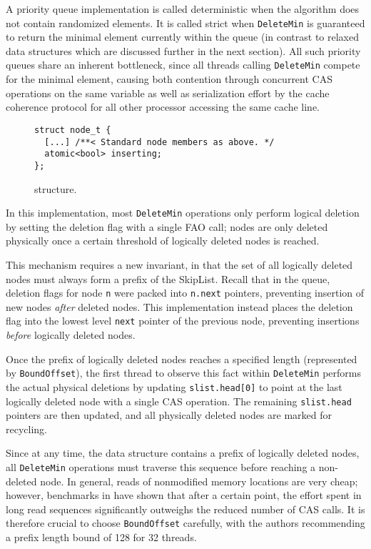 A priority queue implementation is called deterministic when the algorithm does not contain randomized elements.
It is called strict when \lstinline|DeleteMin| is guaranteed to return the minimal element currently within the queue
(in contrast to relaxed data structures which are discussed further in the next section).
All such priority queues share an inherent bottleneck, since all threads calling \lstinline|DeleteMin| compete
for the minimal element, causing both contention through concurrent \ac{CAS} operations on the same variable
as well as serialization effort by the cache coherence protocol for all other processor accessing the same cache
line.

\begin{figure}[ht]
\begin{lstlisting}
struct node_t {
  [...] /**< Standard node members as above. */
  atomic<bool> inserting;
};
\end{lstlisting}
\caption{\citeauthor{linden2013skiplist} structure.}
\label{fig:lindensl}
\end{figure}

In this implementation, most \lstinline|DeleteMin| operations only perform logical deletion by setting
the deletion flag with a single \ac{FAO} call; nodes are only deleted physically once a certain
threshold of logically deleted nodes is reached.

This mechanism requires a new invariant, in that the set of all logically deleted nodes must always
form a prefix of the SkipList. Recall that in the \citeauthor{sundell2003fast} queue, deletion flags
for node \lstinline|n| were packed into \lstinline|n.next| pointers, preventing insertion of new
nodes \emph{after} deleted nodes. This implementation instead places the deletion flag into the
lowest level \lstinline|next| pointer of the previous node, preventing insertions \emph{before}
logically deleted nodes.

Once the prefix of logically deleted nodes reaches a specified length (represented by \lstinline|BoundOffset|),
the first thread to observe this fact within \lstinline|DeleteMin| performs the actual physical
deletions by updating \lstinline|slist.head[0]| to point at the last logically deleted node with a
single \ac{CAS} operation. The remaining \lstinline|slist.head| pointers are then updated, and
all physically deleted nodes are marked for recycling.

Since at any time, the data structure contains a prefix of logically deleted nodes, all \lstinline|DeleteMin|
operations must traverse this sequence before reaching a non-deleted node. In general, reads of nonmodified
memory locations are very cheap; however, benchmarks in \cite{linden2013skiplist} have shown that
after a certain point, the effort spent in long read sequences significantly outweighs the reduced
number of \ac{CAS} calls. It is therefore crucial to choose \lstinline|BoundOffset| carefully, with the
authors recommending a prefix length bound of 128 for 32 threads.

